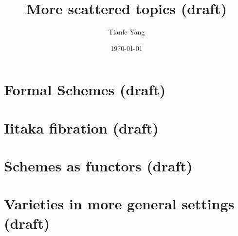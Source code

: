 \documentclass[sectionlevel=chapter]{noteformyself}
\title{More scattered topics (draft)}
\author{Tianle Yang}
\date{\today}
\begin{document}
    \maketitle

    \tableofcontents

    \section{Formal Schemes (draft)}
    
    \section{Iitaka fibration (draft)}
    
    \section{Schemes as functors (draft)}
    
    \section{Varieties in more general settings (draft)}
    

    \printbibliography[heading=bibintoc, title={References}]
    
\end{document}
